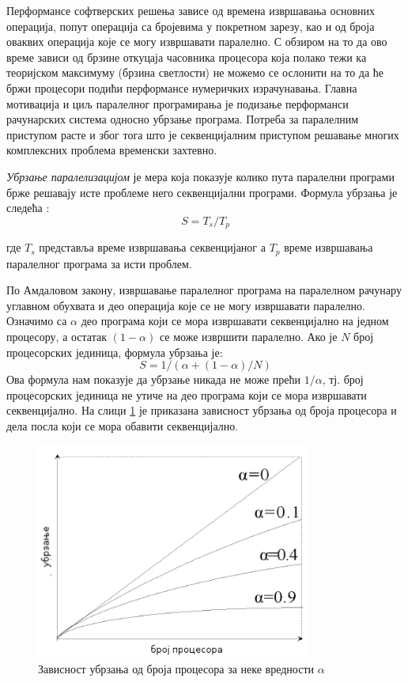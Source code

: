 \documentclass[12pt,oneside]{memoir}
\begin{document}
    Перформансе софтверских решења зависе од времена извршавања основних операција, попут операција са бројевима у покретном зарезу, као и од броја оваквих операција које се могу извршавати паралелно. С обзиром на то да ово време зависи од брзине откуцаја часовника процесора која полако тежи ка теоријском максимуму (брзина светлости) не можемо се ослонити на то да ће бржи процесори подићи перформансе нумеричких израчунавања. Главна мотивација и циљ паралелног програмирања је подизање перформанси рачунарских система односно убрзање програма. Потреба за паралелним приступом расте и због тога што је секвенцијалним приступом решавање многих комплексних проблема временски захтевно.
    
     \emph{Убрзање паралелизацијом} је мера која показује колико пута паралелни програми брже решавају исте проблеме него секвенцијални програми. Формула убрзања је следећа \cite{par_various}:
 	$$ S = T_s/T_p $$
 	
\noindent где $ T_s $ представља време извршавања секвенцијаног а $ T_p $ време извршавања паралелног програма за исти проблем. 

 По Амдаловом закону, извршавање паралелног програма на паралелном рачунару углавном обухвата и део операција које се не могу извршавати паралелно. Означимо са $ \alpha $ део програма који се мора извршавати секвенцијално на једном процесору, а остатак $ (1 - \alpha)$ се може извршити паралелно. Ако је $ N $ број процесорских јединица, формула убрзања је: 
 	$$ S = 1 / ( \alpha + (1-\alpha)/N)$$
Ова формула нам показује да убрзање никада не може прећи $ 1/\alpha $, тј. број процесорских јединица не утиче на део програма који се мора извршавати секвенцијално. На слици \ref{fig:amdal} је приказана зависност убрзања од броја процесора и дела посла који се мора обавити секвенцијално.

 \begin{figure}[!ht]
  \centering
  \includegraphics[width=0.8\textwidth]{img/amdal.png}
  \caption{Зависност убрзања од броја процесора за неке вредности $ \alpha $ }
  \label{fig:amdal}
\end{figure}
\end{document}
